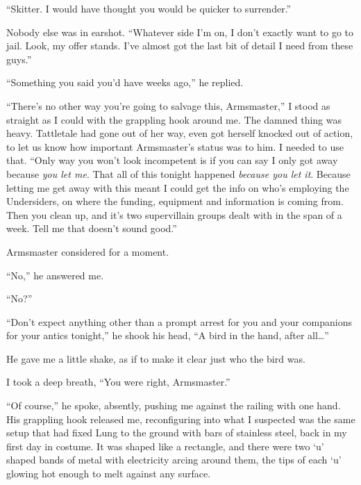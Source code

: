 ``Skitter.  I would have thought you would be quicker to surrender.''



Nobody else was in earshot.  ``Whatever side I'm on, I don't exactly want to go to jail.  Look, my offer stands.  I've almost got the last bit of detail I need from these guys.''



``Something you said you'd have weeks ago,'' he replied.



``There's no other way you're going to salvage this, Armsmaster,'' I stood as straight as I could with the grappling hook around me.  The damned thing was heavy.  Tattletale had gone out of her way, even got herself knocked out of action, to let us know how important Armsmaster's status was to him.  I needed to use that.  ``Only way you won't look incompetent is if you can say I only got away because \emph{you let me}.  That all of this tonight happened \emph{because you let it}.  Because letting me get away with this meant I could get the info on who's employing the Undersiders, on where the funding, equipment and information is coming from.  Then you clean up, and it's two supervillain groups dealt with in the span of a week.  Tell me that doesn't sound good.''



Armsmaster considered for a moment.



``No,'' he answered me.



``No?''



``Don't expect anything other than a prompt arrest for you and your companions for your antics tonight,'' he shook his head, ``A bird in the hand, after all\ldots''



He gave me a little shake, as if to make it clear just who the bird was.



I took a deep breath, ``You were right, Armsmaster.''



``Of course,'' he spoke, absently, pushing me against the railing with one hand.  His grappling hook released me, reconfiguring into what I suspected was the same setup that had fixed Lung to the ground with bars of stainless steel, back in my first day in costume.  It was shaped like a rectangle, and there were two `u' shaped bands of metal with electricity arcing around them, the tips of each `u' glowing hot enough to melt against any surface.



